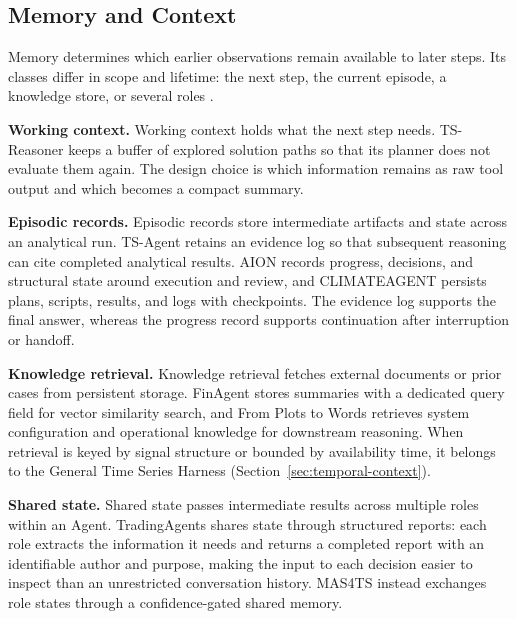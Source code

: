 \documentclass[preprints,article,submit,moreauthors]{Definitions/mdpi}
\begin{document}
\subsection{Memory and Context}
\label{sec:gh-memory}

Memory determines which earlier observations remain available to later steps. Its classes differ in scope and lifetime: the next step, the current episode, a knowledge store, or several roles \citep{sumers2024coala,ning2026codeharness}.

\noindent\textbf{Working context.} Working context holds what the next step needs. TS-Reasoner \citep{tsreasoner2026} keeps a buffer of explored solution paths so that its planner does not evaluate them again. The design choice is which information remains as raw tool output and which becomes a compact summary.

\noindent\textbf{Episodic records.} Episodic records store intermediate artifacts and state across an analytical run. TS-Agent \citep{tsagent2025} retains an evidence log so that subsequent reasoning can cite completed analytical results. AION \citep{aion2026} records progress, decisions, and structural state around execution and review, and CLIMATEAGENT \citep{climateagent2025} persists plans, scripts, results, and logs with checkpoints. The evidence log supports the final answer, whereas the progress record supports continuation after interruption or handoff.

\noindent\textbf{Knowledge retrieval.} Knowledge retrieval fetches external documents or prior cases from persistent storage. FinAgent \citep{finagent2024} stores summaries with a dedicated query field for vector similarity search, and From Plots to Words \citep{plotstowords2026} retrieves system configuration and operational knowledge for downstream reasoning. When retrieval is keyed by signal structure or bounded by availability time, it belongs to the General Time Series Harness (Section~\ref{sec:temporal-context}).

\noindent\textbf{Shared state.} Shared state passes intermediate results across multiple roles within an Agent. TradingAgents \citep{tradingagents2024} shares state through structured reports: each role extracts the information it needs and returns a completed report with an identifiable author and purpose, making the input to each decision easier to inspect than an unrestricted conversation history. MAS4TS \citep{mas4ts2026} instead exchanges role states through a confidence-gated shared memory.
\end{document}
